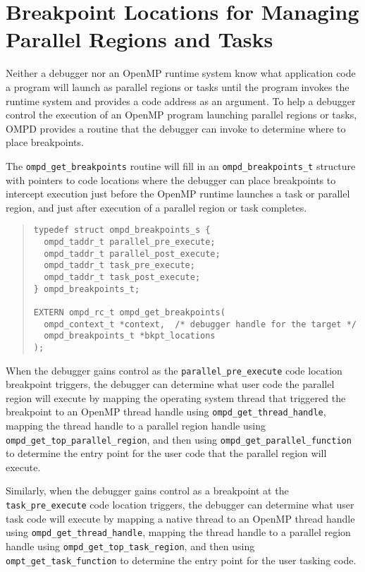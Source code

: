 \documentclass{article}
\begin{document}
\section{Breakpoint Locations for Managing Parallel Regions and Tasks}
Neither a debugger nor an OpenMP runtime system know what application code a program will launch as parallel regions or tasks until the program invokes the runtime system and provides a code address as an argument.
To help a debugger control the execution of an OpenMP program launching parallel regions or tasks, OMPD provides a routine that the debugger can invoke to 
determine where to place breakpoints. 

The \verb|ompd_get_breakpoints| routine will fill in an  \verb|ompd_breakpoints_t| structure with pointers to code locations where the debugger can place breakpoints to intercept execution just before the OpenMP runtime launches a task or parallel region, and just after execution of a parallel region or task completes. 
\begin{quote}
\begin{verbatim}
typedef struct ompd_breakpoints_s {
  ompd_taddr_t parallel_pre_execute;
  ompd_taddr_t parallel_post_execute;
  ompd_taddr_t task_pre_execute;
  ompd_taddr_t task_post_execute;
} ompd_breakpoints_t;

EXTERN ompd_rc_t ompd_get_breakpoints(
  ompd_context_t *context,  /* debugger handle for the target */
  ompd_breakpoints_t *bkpt_locations
);
\end{verbatim}
\end{quote}


When the debugger gains control as the 
  \verb|parallel_pre_execute| code location breakpoint  triggers, 
the debugger can determine what user code the parallel region will execute by mapping the operating system thread that triggered the breakpoint
 to an OpenMP thread handle 
using \verb|ompd_get_thread_handle|, mapping the thread handle to a parallel region handle using \verb|ompd_get_top_parallel_region|, and then using
\verb|ompd_get_parallel_function| to determine the entry point for the user code that the parallel region will execute. 

Similarly, when the debugger gains control as a breakpoint at the  \verb|task_pre_execute| code location  triggers, 
the debugger can determine what user task code will execute by mapping a native thread to an OpenMP thread handle 
using \verb|ompd_get_thread_handle|, mapping the thread handle to a parallel region handle using \verb|ompd_get_top_task_region|, and then using
\verb|ompt_get_task_function| to determine the entry point for the user tasking code.
\end{document}

